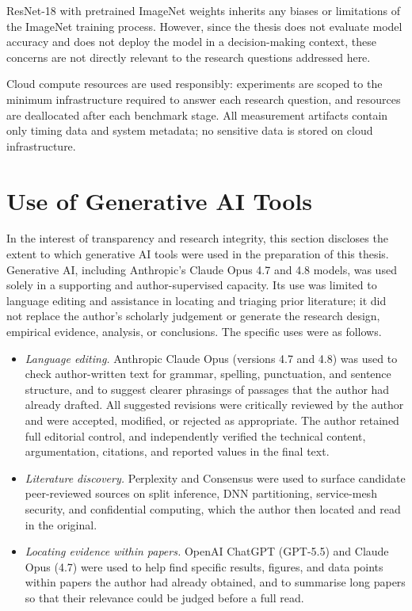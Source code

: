 ResNet-18 with pretrained ImageNet weights inherits any biases or limitations of the
ImageNet training process.
However, since the thesis does not evaluate model accuracy and does not deploy the model
in a decision-making context, these concerns are not directly relevant to the research
questions addressed here.

Cloud compute resources are used responsibly: experiments are scoped to the minimum
infrastructure required to answer each research question, and resources are
deallocated after each benchmark stage.
All measurement artifacts contain only timing data and system metadata; no sensitive
data is stored on cloud infrastructure.

\section{Use of Generative AI Tools}
\label{sec:methods-ai}

In the interest of transparency and research integrity, this section discloses the
extent to which generative AI tools were used in the preparation of this thesis.
Generative AI, including Anthropic's Claude Opus 4.7 and 4.8 models, was used solely in
a supporting and author-supervised capacity. Its use was limited to language editing
and assistance in locating and triaging prior literature; it did not replace the
author's scholarly judgement or generate the research design, empirical evidence,
analysis, or conclusions. The specific uses were as follows.

\begin{itemize}
    \item \emph{Language editing.} Anthropic Claude Opus (versions 4.7 and 4.8) was used to
    check author-written text for grammar, spelling, punctuation, and sentence
    structure, and to suggest clearer phrasings of passages that the author had already
    drafted. All suggested revisions were critically reviewed by the author and were
    accepted, modified, or rejected as appropriate. The author retained full editorial
    control, and independently verified the technical content, argumentation, citations,
    and reported values in the final text.
    \item \emph{Literature discovery.} Perplexity and Consensus were used to surface
    candidate peer-reviewed sources on split inference, DNN partitioning, service-mesh
    security, and confidential computing, which the author then located and read in the
    original.
    \item \emph{Locating evidence within papers.} OpenAI ChatGPT (GPT-5.5) and Claude
    Opus (4.7) were used to help find specific results, figures, and data points within
    papers the author had already obtained, and to summarise long papers so that their
    relevance could be judged before a full read.
\end{itemize}

